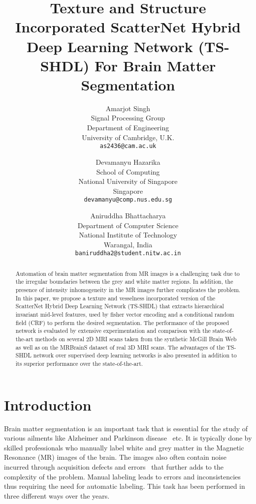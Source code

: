 \documentclass[10pt,twocolumn,letterpaper]{article}
\title{Texture and Structure Incorporated ScatterNet Hybrid Deep Learning Network (TS-SHDL) For Brain Matter Segmentation}
\begin{document}

\author{Amarjot Singh\\
Signal Processing Group \\ 
Department of Engineering \\
University of Cambridge, U.K.\\
{\tt\small as2436@cam.ac.uk}
\and
Devamanyu Hazarika\\
School of Computing \\
National University of Singapore \\
Singapore \\
{\tt\small devamanyu@comp.nus.edu.sg}
\and
Aniruddha Bhattacharya\\
Department of Computer Science \\
National Institute of Technology \\
Warangal, India \\
{\tt\small baniruddha2@student.nitw.ac.in}}

\maketitle


\begin{abstract}
Automation of brain matter segmentation from MR images is a challenging task due to the irregular boundaries between the grey and white matter regions. In addition, the presence of intensity inhomogeneity in the MR images further complicates the problem. In this paper, we propose a texture and vesselness incorporated version of the ScatterNet Hybrid Deep Learning Network (TS-SHDL) that extracts hierarchical invariant mid-level features, used by fisher vector encoding and a conditional random field (CRF) to perform the desired segmentation. The performance of the proposed network is evaluated by extensive experimentation and comparison with the state-of-the-art methods on several 2D MRI scans taken from the synthetic McGill Brain Web as well as on the MRBrainS dataset of real 3D MRI scans. The advantages of the TS-SHDL network over supervised deep learning networks is also presented in addition to its superior performance over the state-of-the-art.
\end{abstract}

\section{Introduction}
Brain matter segmentation is an important task that is essential for the study of various ailments like Alzheimer and Parkinson disease~\cite{lowe2004distinctive} etc. It is typically done by skilled professionals who manually label white and grey matter in the Magnetic Resonance (MR) images of the brain. The images also often contain noise incurred through acquisition defects and errors~\cite{vovk2007review} that further adds to the complexity of the problem. Manual labeling leads to errors and inconsistencies thus requiring the need for automatic labeling. This task has been performed in three different ways over the years.
\end{document}

